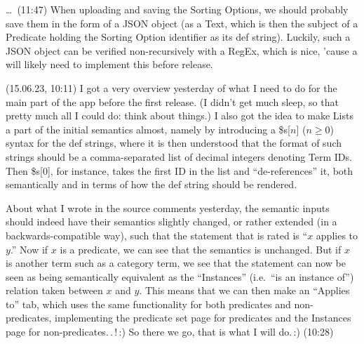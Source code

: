 \documentclass{report}
\begin{document}
\ldots\ (11:47) When uploading and saving the Sorting Options, we should probably save them in the form of a JSON object (as a Text, which is then the subject of a Predicate holding the Sorting Option identifier as its def string). Luckily, such a JSON object can be verified non-recursively with a RegEx, which is nice, 'cause a will likely need to implement this before release.


(15.06.23, 10:11) I got a very overview yesterday of what I need to do for the main part of the app before the first release. (I didn't get much sleep, so that pretty much all I could do: think about things.) I also got the idea to make Lists a part of the initial semantics almost, namely by introducing a \$s[$n$] ($n\geq 0$) syntax for the def strings, where it is then understood that the format of such strings should be a comma-separated list of decimal integers denoting Term IDs. Then \$s[0], for instance, takes the first ID in the list and ``de-references'' it, both semantically and in terms of how the def string should be rendered.

About what I wrote in the source comments yesterday, the semantic inputs should indeed have their semantics slightly changed, or rather extended (in a backwards-compatible way), such that the statement that is rated is ``$x$ applies to $y$.'' Now if $x$ is a predicate, we can see that the semantics is unchanged. But if $x$ is another term such as a category term, we see that the statement can now be seen as being semantically equivalent as the ``Instances'' (i.e.\ ``is an instance of'') relation taken between $x$ and $y$. This means that we can then make an ``Applies to'' tab, which uses the same functionality for both predicates and non-predicates, implementing the predicate set page for predicates and the Instances page for non-predicates.\,.\,!\,:) So there we go, that is what I will do.\,:) (10:28)
\end{document}
